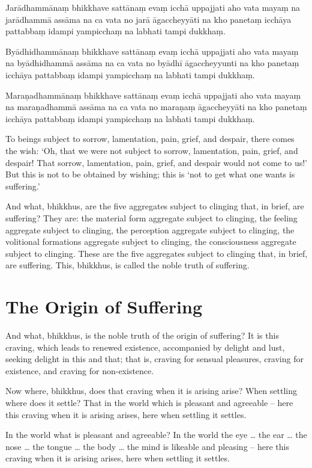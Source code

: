 Jarādhammānaṃ bhikkhave sattānaṃ evaṃ icchā uppajjati aho vata mayaṃ na
jarādhammā assāma na ca vata no jarā āgaccheyyāti na kho panetaṃ icchāya
pattabbaṃ idampi yampicchaṃ na labhati tampi dukkhaṃ.

Byādhidhammānaṃ bhikkhave sattānaṃ evaṃ icchā uppajjati aho vata mayaṃ na
byādhidhammā assāma na ca vata no byādhī āgaccheyyunti na kho panetaṃ icchāya
pattabbaṃ idampi yampicchaṃ na labhati tampi dukkhaṃ.

Maraṇadhammānaṃ bhikkhave sattānaṃ evaṃ icchā uppajjati aho vata mayaṃ na
maraṇadhammā assāma na ca vata no maraṇaṃ āgaccheyyāti na kho panetaṃ icchāya
pattabbaṃ idampi yampicchaṃ na labhati tampi dukkhaṃ.

\englishPage

To beings subject to sorrow, lamentation, pain, grief, and despair, there comes
the wish: `Oh, that we were not subject to sorrow, lamentation, pain, grief, and
despair! That sorrow, lamentation, pain, grief, and despair would not come to
us!' But this is not to be obtained by wishing; this is `not to get what one
wants is suffering.'

And what, bhikkhus, are the five aggregates subject to clinging that, in brief,
are suffering? They are: the material form aggregate subject to clinging, the
feeling aggregate subject to clinging, the perception aggregate subject to
clinging, the volitional formations aggregate subject to clinging, the
consciousness aggregate subject to clinging. These are the five aggregates
subject to clinging that, in brief, are suffering. This, bhikkhus, is called the
noble truth of suffering.

\section{The Origin of Suffering}

And what, bhikkhus, is the noble truth of the origin of suffering? It is this
craving, which leads to renewed existence, accompanied by delight and lust,
seeking delight in this and that; that is, craving for sensual pleasures,
craving for existence, and craving for non-existence.

Now where, bhikkhus, does that craving when it is arising arise? When settling
where does it settle? That in the world which is pleasant and agreeable -- here
this craving when it is arising arises, here when settling it settles.

In the world what is pleasant and agreeable? In the world the eye \ldots{} the
ear \ldots{} the nose \ldots{} the tongue \ldots{} the body \ldots{} the mind is
likeable and pleasing -- here this craving when it is arising arises, here when
settling it settles.

